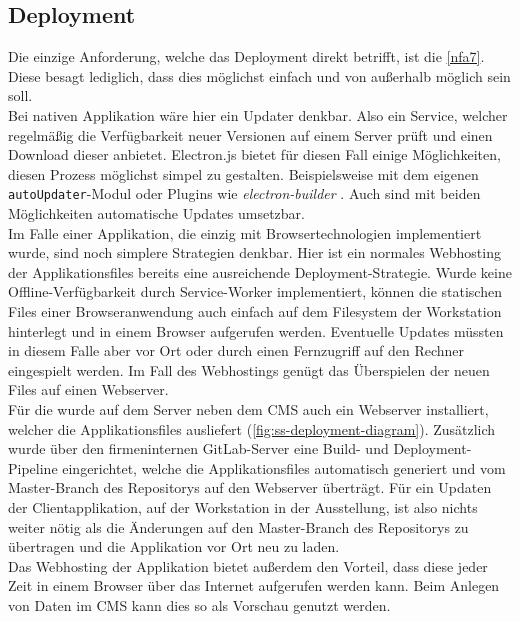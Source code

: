 \subsection{Deployment}
\label{subs:deployment}

Die einzige Anforderung, welche das Deployment direkt betrifft, ist die 
\ref{nfa7}. Diese besagt lediglich, dass dies möglichst einfach und von außerhalb möglich
sein soll.\\
Bei nativen Applikation wäre hier ein Updater denkbar. Also ein Service,
welcher regelmäßig die Verfügbarkeit neuer Versionen auf einem Server prüft und einen Download 
dieser anbietet. Electron.js bietet für diesen Fall einige Möglichkeiten, diesen Prozess 
möglichst simpel zu gestalten. Beispielsweise mit dem eigenen 
\texttt{autoUpdater}-Modul \cite{electron-autoUpdater} oder Plugins wie 
\emph{electron-builder} \cite{electron-builder}. Auch sind mit beiden Möglichkeiten
automatische Updates umsetzbar.\\
Im Falle einer Applikation, die einzig mit Browsertechnologien implementiert wurde, sind 
noch simplere Strategien denkbar. Hier ist ein normales Webhosting der Applikationsfiles 
bereits eine ausreichende Deployment-Strategie. Wurde keine Offline-Verfügbarkeit durch
Service-Worker implementiert, können die statischen Files einer Browseranwendung
auch einfach auf dem Filesystem der Workstation hinterlegt und in einem Browser aufgerufen 
werden. Eventuelle Updates müssten in diesem Falle aber vor Ort oder durch einen
Fernzugriff auf den Rechner eingespielt werden. Im Fall des Webhostings genügt das Überspielen
der neuen Files auf einen Webserver.\\

Für die \shst{} wurde auf dem Server neben dem CMS auch ein Webserver installiert, welcher die 
Applikationsfiles ausliefert (\autoref{fig:ss-deployment-diagram}). Zusätzlich wurde über den 
firmeninternen GitLab-Server \cite{gitlab} eine Build- und Deployment-Pipeline eingerichtet, welche die 
Applikationsfiles automatisch generiert und vom Master-Branch des Repositorys auf den Webserver überträgt. 
Für ein Updaten der Clientapplikation, auf der Workstation in der Ausstellung, ist also nichts weiter 
nötig als die Änderungen auf den Master-Branch des Repositorys zu übertragen und die Applikation vor
Ort neu zu laden.\\
Das Webhosting der Applikation bietet außerdem den Vorteil, dass diese jeder Zeit in einem Browser 
über das Internet aufgerufen werden kann. Beim Anlegen von Daten im CMS kann dies so als
Vorschau genutzt werden. 